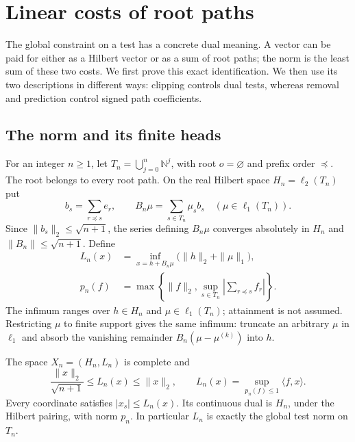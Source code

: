 \section{Linear costs of root paths}
\label{sec:linear-paths}

The global constraint on a test has a concrete dual meaning.  A vector
can be paid for either as a Hilbert vector or as a sum of root paths;
the norm is the least sum of these two costs.  We first prove this exact
identification.  We then use its two descriptions in different ways:
clipping controls dual tests, whereas removal and prediction control
signed path coefficients.

\subsection{The norm and its finite heads}

For an integer $n\ge1$, let
$T_n=\bigcup_{j=0}^n\mathbb N^j$, with root $o=\varnothing$ and
prefix order $\preceq$.  The root belongs to every root path.  On the
real Hilbert space $H_n=\ell_2(T_n)$ put
\[
 b_s=\sum_{r\preceq s}e_r,
 \qquad
 B_n\mu=\sum_{s\in T_n}\mu_s b_s
 \quad(\mu\in\ell_1(T_n)).
\]
Since $\|b_s\|_2\le\sqrt{n+1}$, the series defining $B_n\mu$
converges absolutely in $H_n$ and
$\|B_n\|\le\sqrt{n+1}$.  Define
\begin{align}
 L_n(x)&=\inf_{x=h+B_n\mu}\bigl(\|h\|_2+\|\mu\|_1\bigr),
 \label{eq:linear-cost}\\
 p_n(f)&=\max\left\{\|f\|_2,
       \sup_{s\in T_n}\left|\sum_{r\preceq s}f_r\right|\right\}.
 \label{eq:linear-polar}
\end{align}
The infimum ranges over $h\in H_n$ and $\mu\in\ell_1(T_n)$;
attainment is not assumed.  Restricting $\mu$ to finite support gives
the same infimum: truncate an arbitrary $\mu$ in $\ell_1$ and absorb
the vanishing remainder $B_n(\mu-\mu^{(k)})$ into $h$.

\begin{proposition}
\label{prop:linear-duality}
The space $X_n=(H_n,L_n)$ is complete and
\[
 \frac{\|x\|_2}{\sqrt{n+1}}\le L_n(x)\le\|x\|_2,
 \qquad
 L_n(x)=\sup_{p_n(f)\le1}\langle f,x\rangle.
\]
Every coordinate satisfies $|x_s|\le L_n(x)$.
Its continuous dual is $H_n$, under the Hilbert pairing, with norm
$p_n$.  In particular $L_n$ is exactly the global test norm on $T_n$.
\end{proposition}

